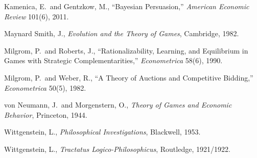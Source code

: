 \documentclass[11pt,oneside]{book}
\theoremstyle{plain}
\theoremstyle{definition}
\theoremstyle{remark}
\begin{document}
\begin{enumerate}[label={[\arabic*]}]
\item Kamenica, E.\ and Gentzkow, M., ``Bayesian Persuasion,'' \emph{American Economic Review} 101(6), 2011.
\item Maynard Smith, J., \emph{Evolution and the Theory of Games}, Cambridge, 1982.
\item Milgrom, P.\ and Roberts, J., ``Rationalizability, Learning, and Equilibrium in Games with Strategic Complementarities,'' \emph{Econometrica} 58(6), 1990.
\item Milgrom, P.\ and Weber, R., ``A Theory of Auctions and Competitive Bidding,'' \emph{Econometrica} 50(5), 1982.
\item von Neumann, J.\ and Morgenstern, O., \emph{Theory of Games and Economic Behavior}, Princeton, 1944.
\item Wittgenstein, L., \emph{Philosophical Investigations}, Blackwell, 1953.
\item Wittgenstein, L., \emph{Tractatus Logico-Philosophicus}, Routledge, 1921/1922.
\end{enumerate}
\end{document}

